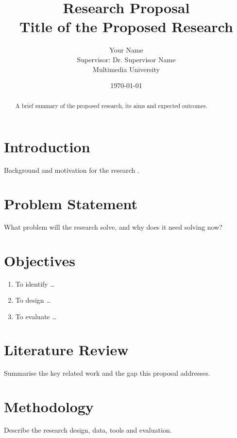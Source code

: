 \documentclass[12pt,a4paper]{article}
\title{\textbf{Research Proposal}\\[0.3em]\large Title of the Proposed Research}
\author{Your Name\\Supervisor: Dr. Supervisor Name\\Multimedia University}
\date{\today}
\begin{document}
\maketitle

\begin{abstract}
A brief summary of the proposed research, its aims and expected outcomes.
\end{abstract}

\section{Introduction}
Background and motivation for the research \citep{creswell2018}.

\section{Problem Statement}
What problem will the research solve, and why does it need solving now?

\section{Objectives}
\begin{enumerate}[label=\textbf{O\arabic*.}]
  \item To identify \ldots
  \item To design \ldots
  \item To evaluate \ldots
\end{enumerate}

\section{Literature Review}
Summarise the key related work and the gap this proposal addresses.

\section{Methodology}
Describe the research design, data, tools and evaluation.
\end{document}
